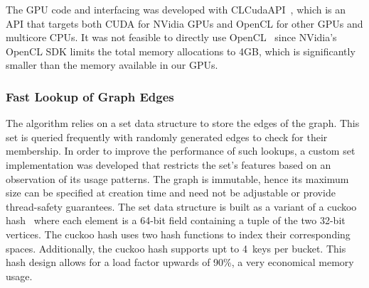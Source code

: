 \begin{comment}
\textit{\bf !!! Remove the history approach !!!}
Initially, the system was developed using OpenCL~\cite{opencl} in order to
accelerate the computations of the algorithm. OpenCL was chosen as it provides
a common abstraction for a variety of compute devices.
However, NVidia's OpenCL SDK limits the
total memory allocations within a context to 4GB which severely limits the
problem sizes that can be tackled on GPUs. Therefore, we migrated the system to
use the abstraction layer CLCudaAPI~\cite{claduc}
to support both OpenCL and CUDA~\cite{Nickolls:2008:SPP:1365490.1365500}
as back-ends.
%
CLCudaAPI
hides the difference between OpenCL and the CUDA driver API.
For example, the library provides abstractions for Device, Context, Queue and
Buffer. Additionally, the implementations use a combination of inline functions
and preprocessor macros to abstract away the differences between OpenCL's and
CUDA's primitive types, address spaces and functions.
\end{comment}
The GPU code and interfacing was developed with CLCudaAPI~\cite{claduc}, which
is an API that targets both CUDA for NVidia GPUs and OpenCL for other GPUs and
multicore CPUs. It was not feasible to directly use OpenCL~\cite{opencl} since
NVidia's OpenCL SDK limits the total memory allocations to 4GB, which is
significantly smaller than the memory available in our GPUs.

\subsubsection{Fast Lookup of Graph Edges}

The algorithm relies on a set data structure to store the edges of the graph.
This set is queried frequently with randomly generated edges to check for their
membership. In order to improve the performance of such lookups, a custom set
implementation was developed that restricts the set's features based on an
observation of its usage patterns.
The graph is immutable, hence its maximum
size can be specified at creation time and need not be adjustable or provide
thread-safety guarantees. The set data
structure is built as a variant of a cuckoo
hash~\cite{Pagh:2004:CH:1006424.1006426} where each element is a 64-bit
field containing a tuple of the two 32-bit vertices. The cuckoo hash
uses two hash functions to index their corresponding spaces. Additionally, the
cuckoo hash supports upt to 4~keys per bucket. This hash design allows for a load
factor upwards of 90\%, a very economical memory usage.

